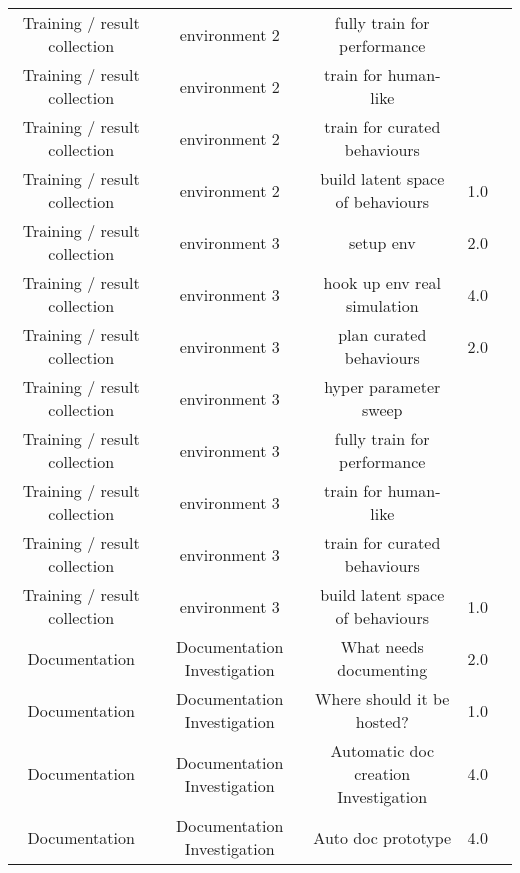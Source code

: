 \begin{longtable}{|c|c|c|c|c|}
	Training / result collection & environment 2 & fully train for performance &  &  \\
	Training / result collection & environment 2 & train for human-like &  &  \\
	Training / result collection & environment 2 & train for curated behaviours &  &  \\
	Training / result collection & environment 2 & build latent space of behaviours & 1.0 &  \\
	Training / result collection & environment 3 & setup env & 2.0 &  \\
	Training / result collection & environment 3 & hook up env real simulation & 4.0 &  \\
	Training / result collection & environment 3 & plan curated behaviours & 2.0 &  \\
	Training / result collection & environment 3 & hyper parameter sweep &  &  \\
	Training / result collection & environment 3 & fully train for performance &  &  \\
	Training / result collection & environment 3 & train for human-like &  &  \\
	Training / result collection & environment 3 & train for curated behaviours &  &  \\
	Training / result collection & environment 3 & build latent space of behaviours & 1.0 &  \\
	Documentation & Documentation Investigation & What needs documenting & 2.0 &  \\
	Documentation & Documentation Investigation & Where should it be hosted? & 1.0 &  \\
	Documentation & Documentation Investigation & Automatic doc creation Investigation & 4.0 &  \\
	Documentation & Documentation Investigation & Auto doc prototype & 4.0 &  \\
\hline
\end{longtable}